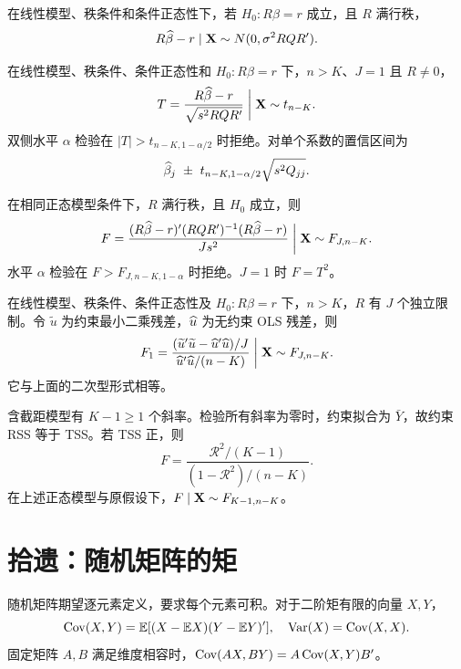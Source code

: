 \begin{theorem}[限制估计量的正态分布]\label{reg:entry:60}
在线性模型、秩条件和条件正态性下，若 $H_0:R\beta=r$ 成立，且 $R$ 满行秩，
\[R\widehat{\beta}-r\mid\mathbf{X}\sim N(0,\sigma^2RQR').\]
\end{theorem}

\begin{theorem}[单个限制的 t 检验]\label{reg:entry:61}
在线性模型、秩条件、条件正态性和 $H_0:R\beta=r$ 下，$n>K$、$J=1$ 且 $R\ne0$，
\[T=\frac{R\widehat{\beta}-r}{\sqrt{s^2RQR'}}\biggm|\mathbf{X}\sim t_{n-K}.\]
双侧水平 $\alpha$ 检验在 $|T|>t_{n-K,1-\alpha/2}$ 时拒绝。对单个系数的置信区间为
\[\bb_j\ \pm\ t_{n-K,1-\alpha/2}\sqrt{s^2Q_{jj}}.\]
\end{theorem}

\begin{proposition}\label{reg:entry:62}
在相同正态模型条件下，$R$ 满行秩，且 $H_0$ 成立，则
\[F=\frac{(R\widehat{\beta}-r)'(RQR')^{-1}(R\widehat{\beta}-r)}{J s^2}\biggm|\mathbf{X}\sim F_{J,n-K}.\]
水平 $\alpha$ 检验在 $F>F_{J,n-K,1-\alpha}$ 时拒绝。$J=1$ 时 $F=T^2$。
\end{proposition}

\begin{theorem}[约束回归形式的 F 检验]\label{reg:entry:63}
在线性模型、秩条件、条件正态性及 $H_0:R\beta=r$ 下，$n>K$，$R$ 有 $J$ 个独立限制。令 $\widetilde u$ 为约束最小二乘残差，$\widehat{u}$ 为无约束 OLS 残差，则
\[F_1=\frac{(\widetilde u'\widetilde u-\widehat{u}'\widehat{u})/J}{\widehat{u}'\widehat{u}/(n-K)}\biggm|\mathbf{X}\sim F_{J,n-K}.\]
它与上面的二次型形式相等。
\end{theorem}

\begin{proposition}[所有斜率的联合检验]\label{reg:entry:64}
含截距模型有 $K-1\geq1$ 个斜率。检验所有斜率为零时，约束拟合为 $\bar Y$，故约束 RSS 等于 TSS。若 TSS 正，则
\[F=\frac{\mathcal R^2/(K-1)}{(1-\mathcal R^2)/(n-K)}.\]
在上述正态模型与原假设下，$F\mid\mathbf{X}\sim F_{K-1,n-K}$。
\end{proposition}

\section{拾遗：随机矩阵的矩}

\begin{definition}[随机向量协方差]\label{reg:entry:65}
随机矩阵期望逐元素定义，要求每个元素可积。对于二阶矩有限的向量 $X,Y$，
\[\operatorname{Cov}(X,Y)=\mathbb{E}[(X-\mathbb{E} X)(Y-\mathbb{E} Y)'],\quad \operatorname{Var}(X)=\operatorname{Cov}(X,X).\]
固定矩阵 $A,B$ 满足维度相容时，$\operatorname{Cov}(AX,BY)=A\operatorname{Cov}(X,Y)B'$。
\end{definition}

